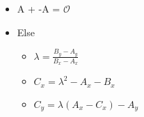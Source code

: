 \begin{itemize}
    \item[] A + -A = $\mathcal{O}$
    \item[] Else
    \begin{itemize}
        \item[] $\lambda = \frac{B_y - A_y} {B_x - A_x}$
        \item[] $C_x = \lambda^2 - A_x - B_x$
        \item[] $C_y = \lambda(A_x - C_x) - A_y$
    \end{itemize}
\end{itemize}

